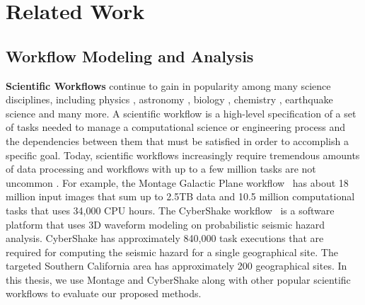                              \chapter{Related Work}
\label{chap:related}






\section{Workflow Modeling and Analysis}
\label{sect:workflow_model}

\textbf{Scientific Workflows} continue to gain in popularity among many science disciplines, including physics \cite{Deelman2002}, astronomy \cite{Sakellariou2010}, biology \cite{Lathers2006, Oinn2004}, chemistry \cite{Wieczorek2005}, earthquake science \cite{Maechling2007} and many more. A scientific workflow is a high-level specification of a set of tasks needed to manage a computational science or engineering process and the dependencies between them that must be satisfied in order to accomplish a specific goal. Today, scientific workflows increasingly require tremendous amounts of data processing and workflows with up to a few million tasks are not uncommon \cite{Callaghan2011}. For example, the Montage Galactic Plane workflow~\cite{Berriman2004} has about 18 million input images that sum up to 2.5TB data and 10.5 million computational tasks that uses 34,000 CPU hours. The CyberShake workflow~\cite{Callaghan2008} is a software platform that uses 3D waveform modeling on probabilistic seismic hazard analysis. CyberShake has approximately 840,000 task executions that are required for computing the seismic hazard for a single geographical site. The targeted Southern California area has approximately 200 geographical sites. In this thesis, we use Montage and CyberShake along with other popular scientific workflows to evaluate our proposed methods. 

